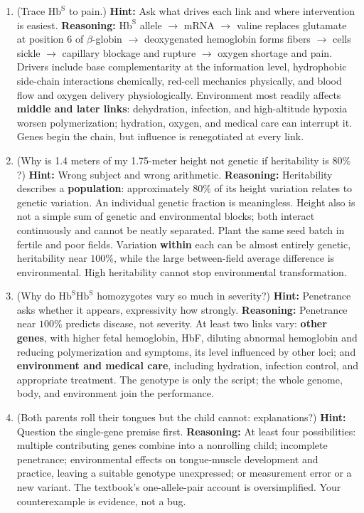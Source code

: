 \begin{enumerate}[itemsep=3pt]
\item (Trace $\mathrm{Hb^{S}}$ to pain.) \textbf{Hint:} Ask what drives each link and where intervention is easiest. \textbf{Reasoning:} $\mathrm{Hb^{S}}$ allele $\rightarrow$ mRNA $\rightarrow$ valine replaces glutamate at position 6 of $\beta$-globin $\rightarrow$ deoxygenated hemoglobin forms fibers $\rightarrow$ cells sickle $\rightarrow$ capillary blockage and rupture $\rightarrow$ oxygen shortage and pain. Drivers include base complementarity at the information level, hydrophobic side-chain interactions chemically, red-cell mechanics physically, and blood flow and oxygen delivery physiologically. Environment most readily affects \textbf{middle and later links}: dehydration, infection, and high-altitude hypoxia worsen polymerization; hydration, oxygen, and medical care can interrupt it. Genes begin the chain, but influence is renegotiated at every link.
\item (Why is 1.4 meters of my 1.75-meter height not genetic if heritability is $80\%$?) \textbf{Hint:} Wrong subject and wrong arithmetic. \textbf{Reasoning:} Heritability describes a \textbf{population}: approximately $80\%$ of its height variation relates to genetic variation. An individual genetic fraction is meaningless. Height also is not a simple sum of genetic and environmental blocks; both interact continuously and cannot be neatly separated. Plant the same seed batch in fertile and poor fields. Variation \textbf{within} each can be almost entirely genetic, heritability near $100\%$, while the large between-field average difference is environmental. High heritability cannot stop environmental transformation.
\item (Why do $\mathrm{Hb^{S}Hb^{S}}$ homozygotes vary so much in severity?) \textbf{Hint:} Penetrance asks whether it appears, expressivity how strongly. \textbf{Reasoning:} Penetrance near $100\%$ predicts disease, not severity. At least two links vary: \textbf{other genes}, with higher fetal hemoglobin, HbF, diluting abnormal hemoglobin and reducing polymerization and symptoms, its level influenced by other loci; and \textbf{environment and medical care}, including hydration, infection control, and appropriate treatment. The genotype is only the script; the whole genome, body, and environment join the performance.
\item (Both parents roll their tongues but the child cannot: explanations?) \textbf{Hint:} Question the single-gene premise first. \textbf{Reasoning:} At least four possibilities: multiple contributing genes combine into a nonrolling child; incomplete penetrance; environmental effects on tongue-muscle development and practice, leaving a suitable genotype unexpressed; or measurement error or a new variant. The textbook's one-allele-pair account is oversimplified. Your counterexample is evidence, not a bug.

\end{enumerate}
